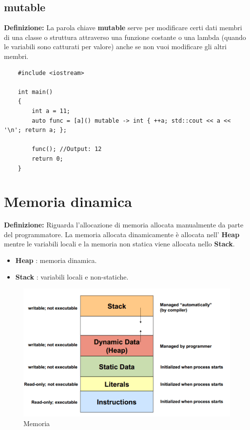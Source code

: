 
\subsection{mutable}

\textsf{\small \textbf{Definizione: } La parola chiave \textbf{mutable} serve per modificare certi dati membri di una classe o struttura attraverso una funzione costante o una lambda (quando le variabili sono catturati per valore) anche se non vuoi modificare gli altri membri.} \\

\begin{lstlisting}
	#include <iostream>
	
	int main()
	{
		int a = 11;
		auto func = [a]() mutable -> int { ++a; std::cout << a << '\n'; return a; };
		
		func(); //Output: 12
		return 0;
	}
\end{lstlisting}



\newpage

\section{Memoria dinamica}

\textsf{\small \textbf{Definizione: } Riguarda l'allocazione di memoria allocata manualmente da parte del programmatore. La memoria allocata dinamicamente è allocata nell' \textbf{Heap} mentre le variabili locali e la memoria non statica viene allocata nello \textbf{Stack}.}

\begin{itemize}
	\item \textsf{\small \textbf{Heap} : memoria dinamica.}
	\item \textsf{\small \textbf{Stack} : variabili locali e non-statiche.}
\end{itemize}

\begin{figure}[H]
	\centering
	\includegraphics[width=.9\textwidth, height=.9\textheight, keepaspectratio]{./imgs/allocate_and_deallocate_memory2.png}
	\caption{Memoria}
	\label{fig:allocate_and_deallocate_memory}
\end{figure}

